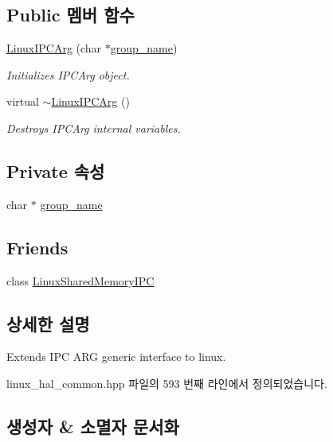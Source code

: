 \subsection*{Public 멤버 함수}
\begin{DoxyCompactItemize}
\item 
\hyperlink{class_linux_i_p_c_arg_aca166c5bd6dbb73790c9d65ca23a9c81}{Linux\+I\+P\+C\+Arg} (char $\ast$\hyperlink{class_linux_i_p_c_arg_af79ba313643b1c6e634d705221930b84}{group\+\_\+name})
\begin{DoxyCompactList}\small\item\em Initializes I\+P\+C\+Arg object. \end{DoxyCompactList}\item 
virtual \hyperlink{class_linux_i_p_c_arg_a7e04846841aafc1c60211296d696a17f}{$\sim$\+Linux\+I\+P\+C\+Arg} ()
\begin{DoxyCompactList}\small\item\em Destroys I\+P\+C\+Arg internal variables. \end{DoxyCompactList}\end{DoxyCompactItemize}
\subsection*{Private 속성}
\begin{DoxyCompactItemize}
\item 
char $\ast$ \hyperlink{class_linux_i_p_c_arg_af79ba313643b1c6e634d705221930b84}{group\+\_\+name}
\end{DoxyCompactItemize}
\subsection*{Friends}
\begin{DoxyCompactItemize}
\item 
class \hyperlink{class_linux_i_p_c_arg_aeae599235e9ea7e0d428f88aceb3f284}{Linux\+Shared\+Memory\+I\+PC}
\end{DoxyCompactItemize}


\subsection{상세한 설명}
Extends I\+PC A\+RG generic interface to linux. 

linux\+\_\+hal\+\_\+common.\+hpp 파일의 593 번째 라인에서 정의되었습니다.



\subsection{생성자 \& 소멸자 문서화}
